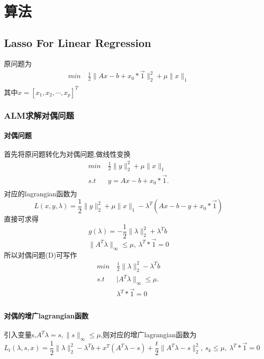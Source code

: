\documentclass[UTF8]{ctexart}
\begin{document}
  
  
  \section{算法}
  \subsection{Lasso For Linear Regression}
  原问题为
  \begin{equation}\label{p:1}
    \begin{split}
       min\  & \frac{1}{2}\|Ax-b +x_0*\vec{1}\|_{2}^{2} + \mu \|x\|_{1} \\
    \end{split}
  \end{equation}
  其中$x=[x_1,x_2,\cdots,x_p]^T$

  \subsubsection{ALM求解对偶问题}
  \paragraph{对偶问题}
  首先将原问题转化为对偶问题,做线性变换
    \begin{equation}
    \begin{split}
       min\  & \frac{1}{2}\|y\|_{2}^{2} + \mu \|x\|_{1} \\
       s.t \ & y=Ax-b+x_0*\vec{1}.\\
    \end{split}
  \end{equation}
  对应的lagrangian函数为
$$
L(x,y,\lambda)=\frac{1}{2}\|y\|_{2}^{2} + \mu \|x\|_{1}-\lambda^{T}(Ax-b-y+x_0*\vec{1})
$$
直接可求得
$$
g(\lambda)= -\frac{1}{2}\|\lambda\|_{2}^{2} + \lambda^{T}b\
$$
$$
\|A^{T}\lambda\|_{\infty}\leq \mu,\ \lambda^T*\vec{1}=0
$$
所以对偶问题(D)可写作
    \begin{equation}
    \begin{split}
       min\  & \frac{1}{2}\|\lambda\|_{2}^{2} - \lambda^{T}b \\
       s.t \ & |A^{T}\lambda\|_{\infty}\leq \mu.\\
           \ &  \lambda^T*\vec{1}=0  \\
    \end{split}
  \end{equation}
\paragraph{对偶的增广lagrangian函数}
引入变量s,$A^{T}\lambda=s,\|s\|_{\infty}\leq \mu$,则对应的增广lagrangian函数为
$$
L_{t}(\lambda,s,x) = \frac{1}{2}\|\lambda\|_{2}^{2} - \lambda^{T}b + x^{T}(A^{T}\lambda-s)+\frac{t}{2}\|A^{T}\lambda-s\|_{2}^2,\  s_k\leq \mu,\  \lambda^T*\vec{1}=0
$$
\end{document}
